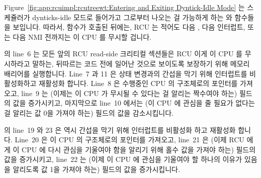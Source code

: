 Figure~\ref{fig:app:rcuimpl:rcutreewt:Entering and Exiting Dyntick-Idle Mode}
는 스케쥴러가 dynticks-idle 모드로 들어가고 그로부터 나오는 걸 가능하게 하는
 와  함수들을 보입니다.
따라서,  함수가 호출된 뒤에는, RCU 는 적어도 다음
, 다음 인터럽트, 또는 다음 NMI 전까지는 이 CPU 를 무시할
겁니다.
\iffalse

Figure~\ref{fig:app:rcuimpl:rcutreewt:Entering and Exiting Dyntick-Idle Mode}
shows the \co{rcu_enter_nohz()} and \co{rcu_exit_nohz()} functions
that allow the scheduler to transition to and from dynticks-idle
mode.
Therefore, after \co{rcu_enter_nohz()} has been call, RCU will ignore
it, at least until the next \co{rcu_exit_nohz()}, the next interrupt,
or the next NMI.
\fi

 의 line~6 는 모든 앞의 RCU read-side 크리티컬 섹션들은
RCU 이게 이 CPU 를 무시하라고 말하는, 뒤따르는 코드 전에 일어난 것으로 보이도록
보장하기 위해 메모리 배리어를 실행합니다.
Line~7 과 11 은 상태 변경과의 간섭을 막기 위해 인터럽트를 비활성화하고 재활성화
합니다.
Line~8 은 수행중인 CPU 의  구조체로의 포인터를 가져오고,
line~9 는 (이제는 이 CPU 가 무시될 수 있다는 걸 알리는 짝수여야 하는)
 필드의 값을 증가시키고, 마지막으로 line~10 에서는 (이 CPU 에
관심을 줄 필요가 없다는 걸 알리는 값 0을 가져야 하는) 
필드의 값을 감소시킵니다.
\iffalse

Line~6 of \co{rcu_enter_nohz()} executes a memory barrier to ensure
that any preceding RCU read-side critical sections are seen to have
occurred before the following code that tells RCU to ignore this CPU.
Lines~7 and 11 disable and restore interrupts in order to avoid
interference with the state change.
Line~8 picks up a pointer to the running CPU's \co{rcu_dynticks}
structure, line~9 increments the \co{->dynticks} field (which now
must be even to indicate that this CPU may be ignored), and finally line~10
decrements the \co{->dynticks_nesting} field (which now must be
zero to indicate that there is no reason to pay attention to this CPU).
\fi

 의 line~19 와 23 은 역시 간섭을 막기 위해 인터럽트를
비활성화 하고 재활성화 합니다.
Line~20 은 이 CPU 의  구조체로의 포인터를 가져오고, line~21 은
(이제 RCU 에게 이 CPU 에 다시 관심을 기울여야 함을 알리기 위해 홀수 값을 가져야
하는)  필드의 값을 증가시키고, line~22 는 (이제 이 CPU 에 관심을
기울여야 할 하나의 이유가 있음을 알리도록 값 1을 가져야 하는)
 필드의 값을 증가시킵니다.
\iffalse

